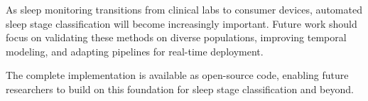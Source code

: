 As sleep monitoring transitions from clinical labs to consumer devices, automated sleep stage classification will become increasingly important. Future work should focus on validating these methods on diverse populations, improving temporal modeling, and adapting pipelines for real-time deployment.

The complete implementation is available as open-source code, enabling future researchers to build on this foundation for sleep stage classification and beyond.

